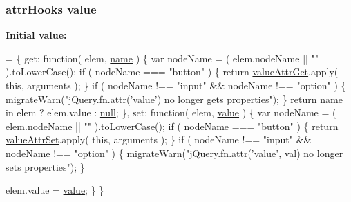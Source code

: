 \subsubsection[{\texorpdfstring{value}{value}}]{ attr\+Hooks value}\hypertarget{jquery-1_8x_8js_abe5393d870043cf6aaa1d5ad5fce755c}{}\label{jquery-1_8x_8js_abe5393d870043cf6aaa1d5ad5fce755c}
{\bfseries Initial value\+:}
\begin{DoxyCode}
= \{
    \textcolor{keyword}{get}: \textcolor{keyword}{function}( elem, \hyperlink{common_8js_a22c29d2aa8ed6161ce8faa718ef76e68}{name} ) \{
        var nodeName = ( elem.nodeName || \textcolor{stringliteral}{""} ).toLowerCase();
        \textcolor{keywordflow}{if} ( nodeName === \textcolor{stringliteral}{"button"} ) \{
            \textcolor{keywordflow}{return} \hyperlink{jquery-1_8x_8js_a02010f66dba9fcc506d69b302cab41fb}{valueAttrGet}.apply( \textcolor{keyword}{this}, arguments );
        \}
        \textcolor{keywordflow}{if} ( nodeName !== \textcolor{stringliteral}{"input"} && nodeName !== \textcolor{stringliteral}{"option"} ) \{
            \hyperlink{jquery-1_8x_8js_ac6036b3100bb484f96bfb15165e077f9}{migrateWarn}(\textcolor{stringliteral}{"jQuery.fn.attr('value') no longer gets properties"});
        \}
        \textcolor{keywordflow}{return} \hyperlink{common_8js_a22c29d2aa8ed6161ce8faa718ef76e68}{name} in elem ?
            elem.value :
            \hyperlink{modernizr_8min_8js_a286f9ec831c5e676eeb493248eab9575}{null};
    \},
    \textcolor{keyword}{set}: \textcolor{keyword}{function}( elem, \hyperlink{jquery-1_8x_8js_abe5393d870043cf6aaa1d5ad5fce755c}{value} ) \{
        var nodeName = ( elem.nodeName || \textcolor{stringliteral}{""} ).toLowerCase();
        \textcolor{keywordflow}{if} ( nodeName === \textcolor{stringliteral}{"button"} ) \{
            \textcolor{keywordflow}{return} \hyperlink{jquery-1_8x_8js_a4f03581a835ab99d3f66b59015ad49ae}{valueAttrSet}.apply( \textcolor{keyword}{this}, arguments );
        \}
        \textcolor{keywordflow}{if} ( nodeName !== \textcolor{stringliteral}{"input"} && nodeName !== \textcolor{stringliteral}{"option"} ) \{
            \hyperlink{jquery-1_8x_8js_ac6036b3100bb484f96bfb15165e077f9}{migrateWarn}(\textcolor{stringliteral}{"jQuery.fn.attr('value', val) no longer sets properties"});
        \}
        
        elem.value = \hyperlink{jquery-1_8x_8js_abe5393d870043cf6aaa1d5ad5fce755c}{value};
    \}
\}
\end{DoxyCode}



